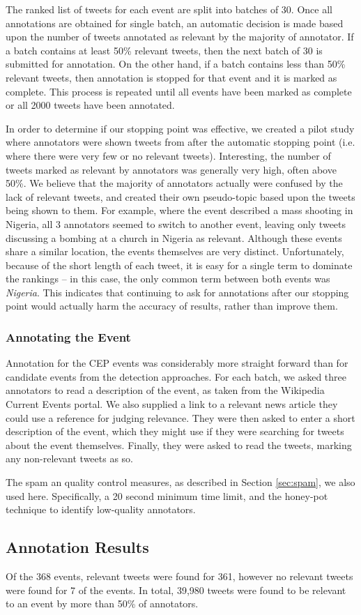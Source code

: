 The ranked list of tweets for each event are split into batches of 30.
Once all annotations are obtained for single batch, an automatic decision is made based upon the number of tweets annotated as relevant by the majority of annotator.
If a batch contains at least 50\% relevant tweets, then the next batch of 30 is submitted for annotation.
On the other hand, if a batch contains less than 50\% relevant tweets, then annotation is stopped for that event and it is marked as complete.
This process is repeated until all events have been marked as complete or all 2000 tweets have been annotated.

In order to determine if our stopping point was effective, we created a pilot study where annotators were shown tweets from after the automatic stopping point (i.e. where there were very few or no relevant tweets).
Interesting, the number of tweets marked as relevant by annotators was generally very high, often above 50\%.
We believe that the majority of annotators actually were confused by the lack of relevant tweets, and created their own pseudo-topic based upon the tweets being shown to them.
For example, where the event described a mass shooting in Nigeria, all 3 annotators seemed to switch to another event, leaving only tweets discussing a bombing at a church in Nigeria as relevant.
Although these events share a similar location, the events themselves are very distinct.
Unfortunately, because of the short length of each tweet, it is easy for a single term to dominate the rankings -- in this case, the only common term between both events was \emph{Nigeria}.
This indicates that continuing to ask for annotations after our stopping point would actually harm the accuracy of results, rather than improve them.

\subsubsection{Annotating the Event}
Annotation for the CEP events was considerably more straight forward than for candidate events from the detection approaches.
For each batch, we asked three annotators to read a description of the event, as taken from the Wikipedia Current Events portal.
We also supplied a link to a relevant news article they could use a reference for judging relevance.
They were then asked to enter a short description of the event, which they might use if they were searching for tweets about the event themselves.
Finally, they were asked to read the tweets, marking any non-relevant tweets as so.

The spam an quality control measures, as described in Section \ref{sec:spam}, we also used here. Specifically, a 20 second minimum time limit, and the honey-pot technique to identify low-quality annotators.

\subsection{Annotation Results}
Of the 368 events, relevant tweets were found for 361, however no relevant tweets were found for 7 of the events.
In total, 39,980 tweets were found to be relevant to an event by more than 50\% of annotators.
